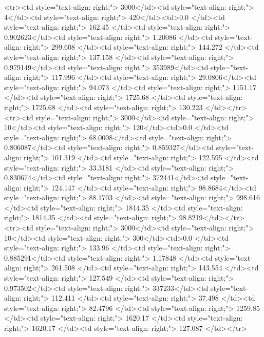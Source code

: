 <tr><td style="text-align: right;">      3000</td><td style="text-align: right;">         4</td><td style="text-align: right;">           420</td><td>0.0          </td><td style="text-align: right;">               162.45  </td><td style="text-align: right;">           0.902623</td><td style="text-align: right;">         1.20086 </td><td style="text-align: right;">        299.608 </td><td style="text-align: right;">           144.272 </td><td style="text-align: right;">             137.158   </td><td style="text-align: right;">             0.979149</td><td style="text-align: right;">              353989</td><td style="text-align: right;">                      117.996 </td><td style="text-align: right;">            29.0806</td><td style="text-align: right;">                94.073  </td><td style="text-align: right;">      1151.17  </td><td style="text-align: right;">   1725.68 </td><td style="text-align: right;">      1725.68 </td><td style="text-align: right;">                130.223 </td></tr>
<tr><td style="text-align: right;">      3000</td><td style="text-align: right;">        10</td><td style="text-align: right;">           120</td><td>0.0          </td><td style="text-align: right;">                68.0008</td><td style="text-align: right;">           0.806087</td><td style="text-align: right;">         0.859327</td><td style="text-align: right;">        101.319 </td><td style="text-align: right;">           122.595 </td><td style="text-align: right;">              33.3181  </td><td style="text-align: right;">             0.830674</td><td style="text-align: right;">              372441</td><td style="text-align: right;">                      124.147 </td><td style="text-align: right;">            98.8684</td><td style="text-align: right;">                88.1703 </td><td style="text-align: right;">       998.616 </td><td style="text-align: right;">   1814.35 </td><td style="text-align: right;">      1814.35 </td><td style="text-align: right;">                 98.8219</td></tr>
<tr><td style="text-align: right;">      3000</td><td style="text-align: right;">        10</td><td style="text-align: right;">           300</td><td>0.0          </td><td style="text-align: right;">               133.96  </td><td style="text-align: right;">           0.885291</td><td style="text-align: right;">         1.17848 </td><td style="text-align: right;">        261.508 </td><td style="text-align: right;">           143.554 </td><td style="text-align: right;">             127.549   </td><td style="text-align: right;">             0.973502</td><td style="text-align: right;">              337233</td><td style="text-align: right;">                      112.411 </td><td style="text-align: right;">            37.498 </td><td style="text-align: right;">                82.4796 </td><td style="text-align: right;">      1259.85  </td><td style="text-align: right;">   1620.17 </td><td style="text-align: right;">      1620.17 </td><td style="text-align: right;">                127.087 </td></tr>
